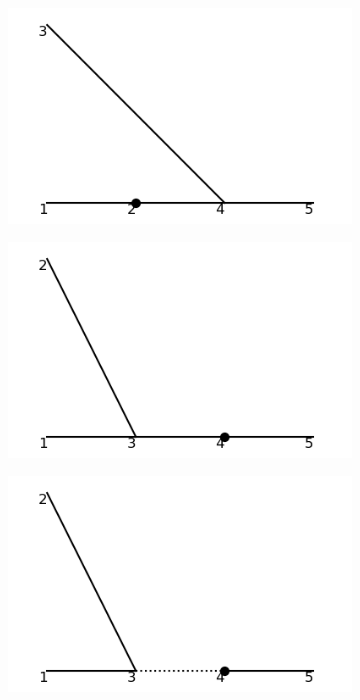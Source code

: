 \documentclass[11pt,a4paper,twoside,pdf]{article}
\numberwithin{equation}{section}
\begin{document}
\begin{figure}[h!]
    \centering
    \begin{subfigure}[t]{0.24\textwidth}
        \centering
        \includegraphics[width=\textwidth]{plots/order3/order3_1to2/counterterms/2.png}
        \caption{ }
    \end{subfigure}
    \hfill
    \begin{subfigure}[t]{0.24\textwidth}
        \centering
        \includegraphics[width=\textwidth]{plots/order3/order3_1to2/counterterms/3.png}
        \caption{ }
    \end{subfigure}
    \hfill
    \begin{subfigure}[t]{0.24\textwidth}
        \centering
        \includegraphics[width=\textwidth]{plots/order3/order3_1to2/counterterms/4.png}

\end{subfigure}
\end{figure}
\end{document}
